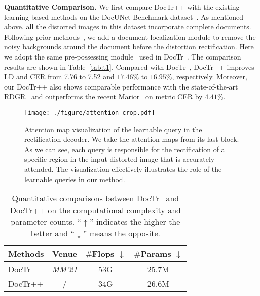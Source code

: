 \documentclass[lettersize,journal]{IEEEtran}
\begin{document}
\smallskip
\textbf{Quantitative Comparison.}
We first compare DocTr++ with the existing learning-based methods on the DocUNet Benchmark dataset~\cite{8578592}. As mentioned above, all the distorted images in this dataset incorporate complete documents. Following prior methods~\cite{feng2021doctr,feng2022geometric,feng2021docscanner,xie2020dewarping,zhang2022marior}, we add a document localization module to remove the noisy backgrounds around the document before the distortion rectification.
Here we adopt the same pre-possessing module~\cite{Qin_2020} used in DocTr~\cite{feng2021doctr}.
The comparison results are shown in Table~\ref{tab:t1}.
Compared with DocTr~\cite{feng2021doctr},
DocTr++ improves LD and CER from 7.76 to 7.52 and $17.46\%$ to $16.95\%$, respectively.
Moreover, our DocTr++ also shows comparable performance with the state-of-the-art RDGR~\cite{jiang2022revisiting} and outperforms the recent Marior~\cite{zhang2022marior} on metric CER by $4.41\%$.

\begin{figure}[t]
  \centering
  \texttt{[image: ./figure/attention-crop.pdf]}
  \caption{Attention map visualization of the learnable query in the rectification decoder. We take the attention maps from its last block. As we can see, each query is responsible for the rectification of a specific region in the input distorted image that is accurately attended. 
  The visualization effectively illustrates the role of the learnable queries in our method.}
  \label{fig:attention}
\end{figure}

\setlength{\tabcolsep}{4.8mm}
\begin{table}[t]
\centering
	\caption{Quantitative comparisons between DocTr~\cite{feng2021doctr} and DocTr++ on the computational complexity and parameter counts. ``$\uparrow$'' indicates the higher the better and ``$\downarrow$'' means the opposite.}
\begin{tabular}{l|c|cc} 
   \toprule
   \textbf{Methods} & \textbf{Venue} &\textbf{$\#$Flops} $\downarrow$ & \textbf{$\#$Params} $\downarrow$  \\ 
   \midrule

    DocTr~\cite{feng2021doctr} & \emph{MM'21} & 53G & 25.7M \\

    \midrule
    DocTr++ & / & 34G & 26.6M  \\
   \bottomrule
\end{tabular}
\label{tab:eff}
\end{table} 
\end{document}
